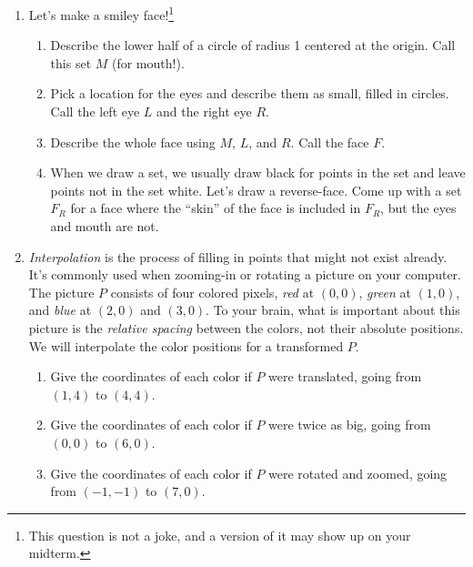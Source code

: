 \begin{enumerate}
			\item Let's make a smiley face!\footnote{ This question is not a joke, and a version of
				it may show up on your midterm.}
				\begin{enumerate}
					\item Describe the lower half of a circle of radius 1 centered at the origin.
						Call this set $M$ (for mouth!).
					\item Pick a location for the eyes and describe them as small, filled in
						circles. Call the left eye $L$ and the right eye $R$.
					\item Describe the whole face using $M$, $L$, and $R$. Call the face $F$.
					\item When we draw a set, we usually draw black
						for points in the set and leave points not in the set white.
						Let's draw a reverse-face. Come up with a set $F_R$
						for a face where the ``skin'' of the face is included in $F_R$, but
						the eyes and mouth are not.
				\end{enumerate}
			\item \emph{Interpolation} is the process of filling in points that might not exist already.
				It's commonly used when zooming-in or rotating a picture on your computer.  The picture $P$ consists
				of four colored pixels, \emph{\color{red}red} at $(0,0)$, \emph{\color{green!70!black}green} at $(1,0)$,
				and \emph{\color{blue}blue} at $(2,0)$ and $(3,0)$. To your brain, what is important about this picture
				is the \emph{relative spacing} between the colors, not their absolute positions. We will interpolate the color
				positions for a transformed $P$.
				\begin{enumerate}
					\item Give the coordinates of each color if $P$ were translated, going from $(1,4)$ to $(4,4)$.
					\item Give the coordinates of each color if $P$ were twice as big, going from $(0,0)$ to $(6,0)$.
					\item Give the coordinates of each color if $P$ were rotated and zoomed, going from $(-1,-1)$ to $(7,0)$.
				\end{enumerate}

		\end{enumerate}
